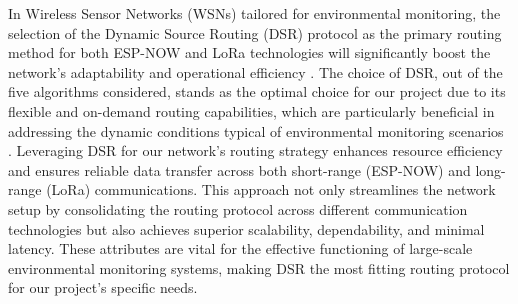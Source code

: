 
In Wireless Sensor Networks (WSNs) tailored for environmental monitoring, the selection of the Dynamic Source Routing (DSR) protocol as the primary routing method for both ESP-NOW and LoRa technologies will significantly boost the network's adaptability and operational efficiency \cite{5497794}. The choice of DSR, out of the five algorithms considered, stands as the optimal choice for our project due to its flexible and on-demand routing capabilities, which are particularly beneficial in addressing the dynamic conditions typical of environmental monitoring scenarios \cite{5431521}. Leveraging DSR for our network's routing strategy enhances resource efficiency and ensures reliable data transfer across both short-range (ESP-NOW) and long-range (LoRa) communications. This approach not only streamlines the network setup by consolidating the routing protocol across different communication technologies but also achieves superior scalability, dependability, and minimal latency. These attributes are vital for the effective functioning of large-scale environmental monitoring systems, making DSR the most fitting routing protocol for our project's specific needs.





